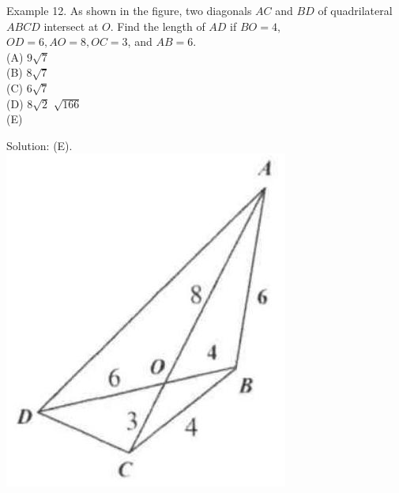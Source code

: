 \documentclass[10pt]{article}
\begin{document}
Example 12. As shown in the figure, two diagonals \(A C\) and \(B D\) of quadrilateral \(A B C D\) intersect at \(O\). Find the length of \(A D\) if \(B O=4\), \(O D=6, A O=8, O C=3\), and \(A B=6\).\\
(A) \(9 \sqrt{7}\)\\
(B) \(8 \sqrt{7}\)\\
(C) \(6 \sqrt{7}\)\\
(D) \(8 \sqrt{2}\) \(\sqrt{166}\)\\
(E)

Solution: (E).\\
\includegraphics[max width=\textwidth, center]{2025_04_17_97bc1f7e44d93c271a88g-081(2)}
\end{document}
